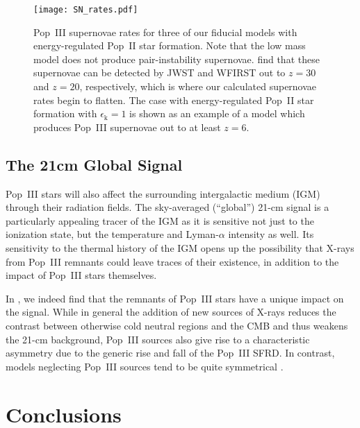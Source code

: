 \documentclass[a4paper,fleqn,usenatbib]{mnras}
\begin{document}
\begin{figure}
	\texttt{[image: SN\_rates.pdf]}
    \caption{Pop~III supernovae rates for three of our fiducial models with energy-regulated Pop~II star formation. Note that the low mass model does not produce pair-instability supernovae. \citet{whalen_2013} find that these supernovae can be detected by JWST and WFIRST out to $z=30$ and $z=20$, respectively, which is where our calculated supernovae rates begin to flatten. The case with energy-regulated Pop~II star formation with $\epsilon_\text{k} = 1$ is shown as an example of a model which produces Pop~III supernovae out to at least $z=6$.}
    \label{fig:SN_rates} 
\end{figure}

\subsection{The 21cm Global Signal}

Pop~III stars will also affect the surrounding intergalactic medium (IGM) through their radiation fields.
The sky-averaged (``global'') 21-cm signal is a particularly appealing tracer of the IGM as it is sensitive not just to the ionization state, but the temperature and Lyman-$\alpha$ intensity as well. 
Its sensitivity to the thermal history of the IGM opens up the possibility that X-rays from 
Pop~III remnants could leave traces of their existence, in addition to the impact of 
Pop~III stars themselves.

In \citet{mirocha_2017},
we indeed find that the remnants of Pop~III stars have a unique impact on the signal. While in general the addition of new sources of X-rays reduces the contrast between otherwise cold neutral regions and the CMB and thus weakens the 21-cm background, Pop~III sources also give rise to a characteristic asymmetry due to the generic rise and fall of the Pop~III SFRD. In contrast, models neglecting Pop~III sources tend to be quite symmetrical \citep{mirocha_2016}.


\section{Conclusions}
\label{sec:conclusion}
\end{document}
